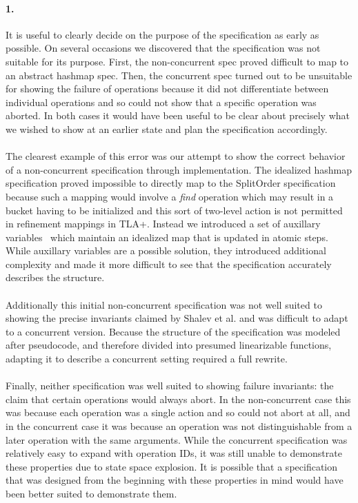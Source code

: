 \documentclass{uit-thesis}
\begin{document}
\paragraph{1.}
It is useful to clearly decide on the purpose of the specification as early as possible. On several occasions we discovered that the specification was not suitable for its purpose. First, the non-concurrent spec proved difficult to map to an abstract hashmap spec. Then, the concurrent spec turned out to be unsuitable for showing the failure of operations because it did not differentiate between individual operations and so could not show that a specific operation was aborted. In both cases it would have been useful to be clear about precisely what we wished to show at an earlier state and plan the specification accordingly.
\\\\
The clearest example of this error was our attempt to show the correct behavior of a non-concurrent specification through implementation. The idealized hashmap specification proved impossible to directly map to the SplitOrder specification because such a mapping would involve a \textit{find} operation which may result in a bucket having to be initialized and this sort of two-level action is not permitted in refinement mappings in TLA+. Instead we introduced a set of auxillary variables~\cite{Lamport2019a} which maintain an idealized map that is updated in atomic steps. While auxillary variables are a possible solution, they introduced additional complexity and made it more difficult to see that the specification accurately describes the structure.
\\\\
Additionally this initial non-concurrent specification was not well suited to showing the precise invariants claimed by Shalev et al. and was difficult to adapt to a concurrent version. Because the structure of the specification was modeled after pseudocode, and therefore divided into presumed linearizable functions, adapting it to describe a concurrent setting required a full rewrite.
\\\\
Finally, neither specification was well suited to showing failure invariants: the claim that certain operations would always abort. In the non-concurrent case this was because each operation was a single action and so could not abort at all, and in the concurrent case it was because an operation was not distinguishable from a later operation with the same arguments. While the concurrent specification was relatively easy to expand with operation IDs, it was still unable to demonstrate these properties due to state space explosion. It is possible that a specification that was designed from the beginning with these properties in mind would have been better suited to demonstrate them.
\end{document}
